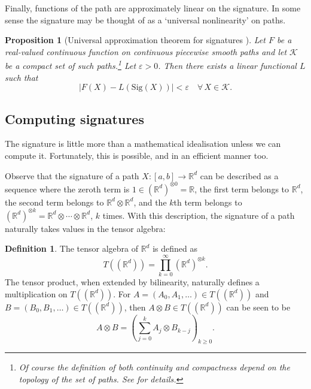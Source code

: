 \documentclass{article}
\theoremstyle{plain}
\newtheorem{proposition}[thm]{Proposition}
\theoremstyle{definition}
\newtheorem{definition}[thm]{Definition}
\begin{document}
Finally, functions of the path are approximately linear on the signature. In some sense the signature may be thought of as a `universal nonlinearity' on paths.
\begin{proposition}[Universal approximation theorem for signatures \cite{lyons2014rough}]\label{prop:universal}
	Let $F$ be a real-valued continuous function on continuous piecewise smooth paths and let $\mathcal K $ be a compact set of such paths.\footnote{Of course the definition of both continuity and compactness depend on the topology of the set of paths. See \cite{lyons2014rough} for details.} Let $\varepsilon >0$. Then there exists a linear functional $L$ such that
	\begin{equation*}\left \vert F(X) - L(\mathrm{Sig}(X)) \right\vert < \varepsilon \quad \forall \, X \in \mathcal K.
	\end{equation*}
\end{proposition}

\subsection{Computing signatures}
The signature is little more than a mathematical idealisation unless we can compute it. Fortunately, this is possible, and in an efficient manner too.

Observe that the signature of a path $ X \colon [a,b] \to \mathbb R^d $ can be described as a sequence where the zeroth term is $1 \in (\mathbb {R}^d)^{\otimes 0} = \mathbb {R} $, the first term belongs to $\mathbb {R}^d$, the second term belongs to $ \mathbb {R}^d \otimes \mathbb {R}^d $, and the $k$th term belongs to $(\mathbb {R}^d)^{\otimes k} = \mathbb {R}^d \otimes \cdots \otimes \mathbb {R}^d$, $ k $ times. With this description, the signature of a path naturally takes values in the tensor algebra:
\begin{definition}
	The tensor algebra of $\mathbb R^d$ is defined as
	\begin{equation*}
	T((\mathbb R^d)) = \prod_{k = 0}^\infty (\mathbb {R}^d)^{\otimes k}.
	\end{equation*}
	The tensor product, when extended by bilinearity, naturally defines a multiplication on $ T((\mathbb R^d)) $. For $A = (A_0, A_1, \ldots) \in T((\mathbb R^d))$ and $B = (B_0, B_1, \ldots) \in T((\mathbb R^d))$, then $A \otimes B \in T((\mathbb R^d))$ can be seen to be
	\begin{equation*}
	A \otimes B = \left(\sum_{j = 0}^k A_j \otimes B_{k - j}\right)_{k \geq 0}.
	\end{equation*}
\end{definition}
\end{document}
